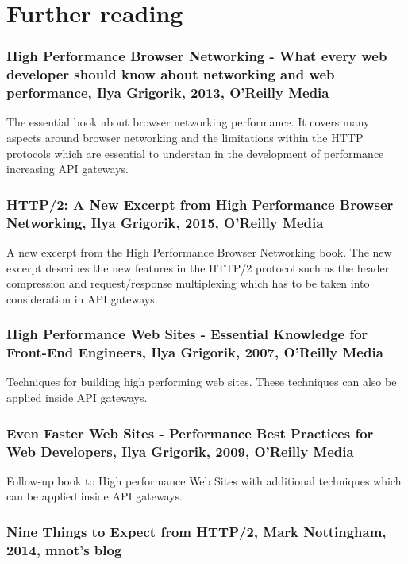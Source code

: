 \documentclass{cslthse-msc}
\begin{document}
\section{Further reading}
\subsubsection{High Performance Browser Networking - What every web developer should know about networking and web performance, Ilya Grigorik, 2013, O'Reilly Media}

The essential book about browser networking performance. It covers many aspects around browser networking and the limitations within the HTTP protocols which are essential to understan in the development of performance increasing API gateways.

\subsubsection{HTTP/2: A New Excerpt from High Performance Browser Networking, Ilya Grigorik, 2015, O'Reilly Media}

A new excerpt from the High Performance Browser Networking book. The new excerpt describes the new features in the HTTP/2 protocol such as the header compression and request/response multiplexing which has to be taken into consideration in API gateways.

\subsubsection{High Performance Web Sites - Essential Knowledge for Front-End Engineers, Ilya Grigorik, 2007, O'Reilly Media}

Techniques for building high performing web sites. These techniques can also be applied inside API gateways.

\subsubsection{Even Faster Web Sites - Performance Best Practices for Web Developers, Ilya Grigorik, 2009, O'Reilly Media}

Follow-up book to High performance Web Sites with additional techniques which can be applied inside API gateways.

\subsubsection{Nine Things to Expect from HTTP/2, Mark Nottingham, 2014, mnot's blog}
\end{document}
